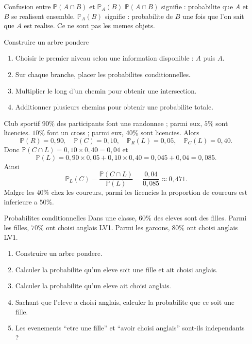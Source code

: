 \documentclass[11pt,a4paper]{article}
\newcommand{\Pp}{\mathbb{P}}
\begin{document}
\begin{boiteattention}{Confusion entre $\Pp(A\cap B)$ et $\Pp_A(B)$}
$\Pp(A\cap B)$ signifie : probabilite que $A$ et $B$ se realisent ensemble. $\Pp_A(B)$ signifie : probabilite de $B$ une fois que l'on sait que $A$ est realise. Ce ne sont pas les memes objets.
\end{boiteattention}

\begin{boitemethode}{Construire un arbre pondere}
\begin{enumerate}
  \item Choisir le premier niveau selon une information disponible : $A$ puis $\overline A$.
  \item Sur chaque branche, placer les probabilites conditionnelles.
  \item Multiplier le long d'un chemin pour obtenir une intersection.
  \item Additionner plusieurs chemins pour obtenir une probabilite totale.
\end{enumerate}
\end{boitemethode}

\begin{boiteexemple}{Club sportif}
$90\%$ des participants font une randonnee ; parmi eux, $5\%$ sont licencies. $10\%$ font un cross ; parmi eux, $40\%$ sont licencies. Alors
\[
\Pp(R)=0,90,\quad \Pp(C)=0,10,\quad \Pp_R(L)=0,05,\quad \Pp_C(L)=0,40.
\]
Donc $\Pp(C\cap L)=0,10\times0,40=0,04$ et
\[
\Pp(L)=0,90\times0,05+0,10\times0,40=0,045+0,04=0,085.
\]
Ainsi
\[
\Pp_L(C)=\frac{\Pp(C\cap L)}{\Pp(L)}=\frac{0,04}{0,085}\approx0,471.
\]
Malgre les $40\%$ chez les coureurs, parmi les licencies la proportion de coureurs est inferieure a $50\%$.
\end{boiteexemple}

\begin{exobox}{Probabilites conditionnelles}
Dans une classe, $60\%$ des eleves sont des filles. Parmi les filles, $70\%$ ont choisi anglais LV1. Parmi les garcons, $80\%$ ont choisi anglais LV1.
\begin{enumerate}
  \item Construire un arbre pondere.
  \item Calculer la probabilite qu'un eleve soit une fille et ait choisi anglais.
  \item Calculer la probabilite qu'un eleve ait choisi anglais.
  \item Sachant que l'eleve a choisi anglais, calculer la probabilite que ce soit une fille.
  \item Les evenements ``etre une fille'' et ``avoir choisi anglais'' sont-ils independants ?
\end{enumerate}
\end{exobox}
\end{document}
